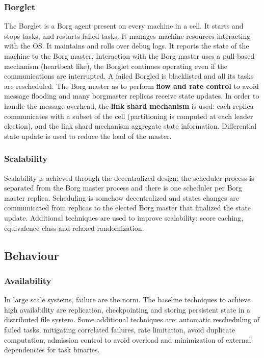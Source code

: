 		\subsubsection{Borglet}
		The Borglet is a Borg agent present on every machine in a cell.\newline
		It starts and stops tasks, and restarts failed tasks.\newline
		It manages machine resources interacting with the OS.\newline
		It maintains and rolls over debug logs.\newline
		It reports the state of the machine to the Borg master.\newline
		\newline
		Interaction with the Borg master uses a pull-based mechanism (heartbeat like), the Borglet continues operating even if the communications are interrupted. A failed Borgled is blacklisted and all its tasks are rescheduled.\newline
		The Borg master as to perform \textbf{flow and rate control} to avoid message flooding and many borgmaster replicas receive state updates. In order to handle the message overhead, the \textbf{link shard mechanism} is used: each replica communicates with a subset of the cell (partitioning is computed at each leader election), and the link shard mechanism aggregate state information. Differential state update is used to reduce the load of the master.
		\subsubsection{Scalability}
		Scalability is achieved through the decentralized design: the scheduler process is separated from the Borg master process and there is one scheduler per Borg master replica. Scheduling is somehow decentralized and states changes are communicated from replicas to the elected Borg master that finalized the state update.\newline
		Additional techniques are used to improve scalability: score caching, equivalence class and relaxed randomization.
	\subsection{Behaviour}
		\subsubsection{Availability}
		In large scale systems, failure are the norm. The baseline techniques to achieve high availability are replication, checkpointing and storing persistent state in a distributed file system.\newline
		Some additional techniques are: automatic rescheduling of failed tasks, mitigating correlated failures, rate limitation, avoid duplicate computation, admission control to avoid overload and minimization of external dependencies for task binaries.
